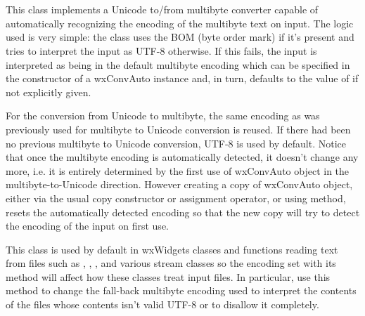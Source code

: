 
\section{}\label{wxconvauto}

This class implements a Unicode to/from multibyte converter capable of
automatically recognizing the encoding of the multibyte text on input. The
logic used is very simple: the class uses the BOM (byte order mark) if it's
present and tries to interpret the input as UTF-8 otherwise. If this fails, the
input is interpreted as being in the default multibyte encoding which can be
specified in the constructor of a wxConvAuto instance and, in turn, defaults to
the value of  if
not explicitly given.

For the conversion from Unicode to multibyte, the same encoding as was
previously used for multibyte to Unicode conversion is reused. If there had
been no previous multibyte to Unicode conversion, UTF-8 is used by default.
Notice that once the multibyte encoding is automatically detected, it doesn't
change any more, i.e. it is entirely determined by the first use of wxConvAuto
object in the multibyte-to-Unicode direction. However creating a copy of
wxConvAuto object, either via the usual copy constructor or assignment
operator, or using  method, resets the
automatically detected encoding so that the new copy will try to detect the
encoding of the input on first use.

This class is used by default in wxWidgets classes and functions reading text
from files such as , , 
,  and
various stream classes so the encoding set with its 
 method will
affect how these classes treat input files. In particular, use this method
to change the fall-back multibyte encoding used to interpret the contents of
the files whose contents isn't valid UTF-8 or to disallow it completely.

